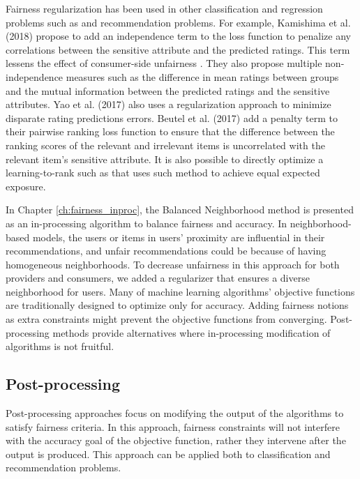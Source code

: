         Fairness regularization has been used in other classification and regression problems such as \cite{kamishima2012fairness,berk2017convex} and recommendation problems. For example, Kamishima et al. (2018) \cite{kamishima2018recommendation} propose to add an independence term to the loss function to penalize any correlations between the sensitive attribute and the predicted ratings. This term lessens the effect of consumer-side unfairness \cite{kamishima2017considerations}. They also propose multiple non-independence measures such as the difference in mean ratings between groups and the mutual information between the predicted ratings and the sensitive attributes. Yao et al. (2017) \cite{yao_huang_fatml-2017} also uses a regularization approach to minimize disparate rating predictions errors. Beutel et al. (2017) \cite{beutel2017data} add a penalty term to their pairwise ranking loss function to ensure that the difference between the ranking scores of the relevant and irrelevant items is uncorrelated with the relevant item's sensitive attribute. It is also possible to directly optimize a learning-to-rank such as \cite{diaz2020} that uses such method to achieve equal expected exposure.

        In Chapter \ref{ch:fairness_inproc}, the Balanced Neighborhood method is presented as an in-processing algorithm to balance fairness and accuracy. In neighborhood-based models, the users or items in users' proximity are influential in their recommendations, and unfair recommendations could be because of having homogeneous neighborhoods. To decrease unfairness in this approach for both providers and consumers, we added a regularizer that ensures a diverse neighborhood for users. Many of machine learning algorithms' objective functions are traditionally designed to optimize only for accuracy. Adding fairness notions as extra constraints might prevent the objective functions from converging. Post-processing methods provide alternatives where in-processing modification of algorithms is not fruitful.

    \subsection{Post-processing}

        Post-processing approaches focus on modifying the output of the algorithms to satisfy fairness criteria. In this approach, fairness constraints will not interfere with the accuracy goal of the objective function, rather they intervene after the output is produced. This approach can be applied both to classification and recommendation problems.
        
